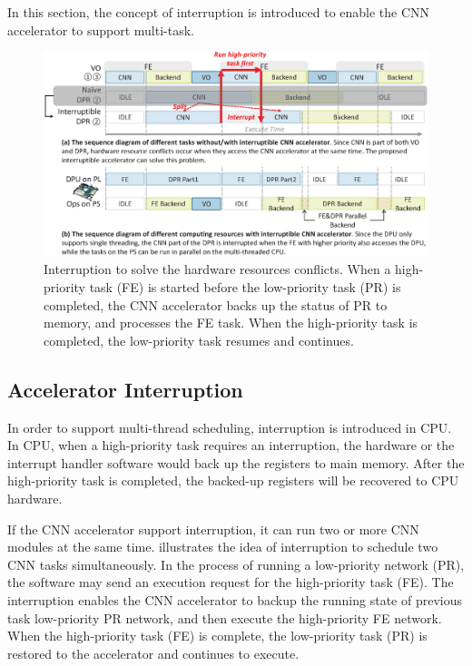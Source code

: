 \label{sec:cnninterrupt}

In this section, the concept of interruption is introduced to enable the CNN accelerator to support multi-task.


\begin{figure}[t]
	\centering
	\includegraphics[width=0.99\linewidth]{fig/interDPR.eps}
	\caption{Interruption to solve the hardware resources conflicts.  When a high-priority task (FE) is started before the low-priority task (PR) is completed, the CNN accelerator backs up the status of PR to memory, and processes the FE task. When the high-priority task is completed, the low-priority task resumes and continues.
    }
	\label{fig:interDPR}
\end{figure}



\subsection{Accelerator Interruption}

In order to support multi-thread scheduling, interruption is introduced in CPU. 
In CPU, when a high-priority task requires an interruption, the hardware or the interrupt handler software would back up the registers to main memory.
After the high-priority task is completed, the backed-up registers will be recovered to CPU hardware. 

If the CNN accelerator support interruption, it can run two or more CNN modules at the same time.  illustrates the idea of interruption to schedule two CNN tasks simultaneously. In the process of running a low-priority network (PR), the software may send an execution request for the high-priority task (FE). The interruption enables the CNN accelerator to backup the running state of previous task low-priority PR network, and then execute the high-priority FE network. When the high-priority task (FE) is complete, the low-priority task (PR) is restored to the accelerator and continues to execute.

